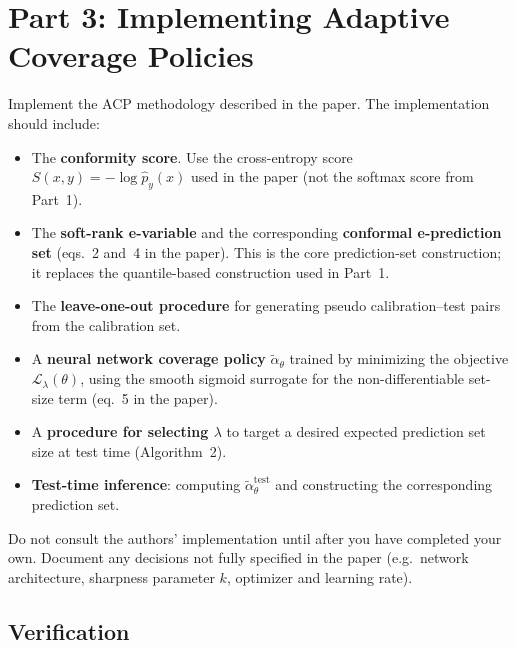\documentclass[11pt]{article}
\begin{document}
\section{Part 3: Implementing Adaptive Coverage Policies}

Implement the ACP methodology described in the paper. The implementation
should include:

\begin{itemize}

  \item The \textbf{conformity score}. Use the cross-entropy score
  $S(x,y) = -\log \hat p_y(x)$ used in the paper (not the softmax score
  from Part~1).

  \item The \textbf{soft-rank e-variable} and the corresponding
  \textbf{conformal e-prediction set} (eqs.~2 and~4 in the paper). This is
  the core prediction-set construction; it replaces the quantile-based
  construction used in Part~1.

  \item The \textbf{leave-one-out procedure} for generating pseudo
  calibration--test pairs from the calibration set.

  \item A \textbf{neural network coverage policy} $\tilde\alpha_\theta$
  trained by minimizing the objective $\mathcal{L}_\lambda(\theta)$, using
  the smooth sigmoid surrogate for the non-differentiable set-size term
  (eq.~5 in the paper).

  \item A \textbf{procedure for selecting $\lambda$} to target a desired
  expected prediction set size at test time (Algorithm~2).

  \item \textbf{Test-time inference}: computing $\tilde\alpha_\theta^{\mathrm{test}}$
  and constructing the corresponding prediction set.

\end{itemize}

Do not consult the authors' implementation until after you have completed
your own. Document any decisions not fully specified in the paper (e.g.\
network architecture, sharpness parameter $k$, optimizer and learning rate).

\subsection{Verification}
\end{document}
